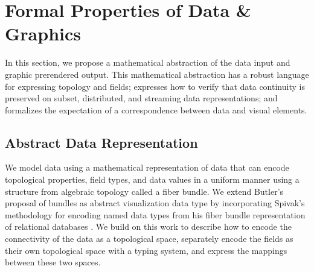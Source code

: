 \documentclass[10pt,journal,compsoc]{IEEEtran}
\theoremstyle{definition}
\theoremstyle{remark}
\begin{document}
\section{Formal Properties of Data \& Graphics}
\label{sec:atct}
In this section, we propose a mathematical abstraction of the data input and graphic prerendered output. This mathematical abstraction has a robust language for expressing topology and fields; expresses how to verify that data continuity is preserved on subset, distributed, and streaming data representations; and formalizes the expectation of a correspondence between data and visual elements. 

\subsection{Abstract Data Representation}
\label{sec:atct:fiber-bundles}
We model data using a mathematical representation of data that can encode topological properties, field types, and data values in a uniform manner using a structure from algebraic topology called a fiber bundle. We extend Butler's proposal of bundles as abstract visualization data type \cite{butlerVectorBundleClassesForm1992,butlerVisualizationModelBased1989} by incorporating Spivak's methodology for encoding named data types from his fiber bundle representation of relational databases \cite{spivakDatabasesAreCategories2010,spivakSimplicialDatabases2009}. We build on this work to describe how to encode the connectivity of the data as a topological space, separately encode the fields as their own topological space with a typing system, and express the mappings between these two spaces.
\end{document}
